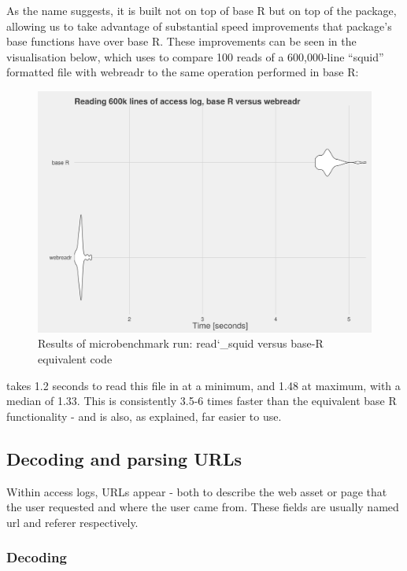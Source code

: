 As the name suggests, it is built not on top of base R but on top of the
 \citep{readr} package, allowing us to take advantage of
substantial speed improvements that package's base functions have over
base R. These improvements can be seen in the visualisation below, which
uses  \citep{microbenchmark} to compare 100
reads of a 600,000-line ``squid'' formatted file with webreadr to the
same operation performed in base R:

\begin{figure}[h]
    \centering
    \includegraphics[scale=0.4]{reading_benchmarks}
    \caption{Results of microbenchmark run: read\char`_squid versus base-R equivalent code}
\end{figure}

 takes 1.2 seconds to read this file in at a minimum, and
1.48 at maximum, with a median of 1.33. This is consistently 3.5-6 times
faster than the equivalent base R functionality - and is also, as
explained, far easier to use.

\subsection{Decoding and parsing URLs}\label{decoding-and-parsing-urls}

Within access logs, URLs appear - both to describe the web asset or page
that the user requested and where the user came from. These fields are
usually named url and referer respectively.

\subsubsection{Decoding}\label{decoding}

